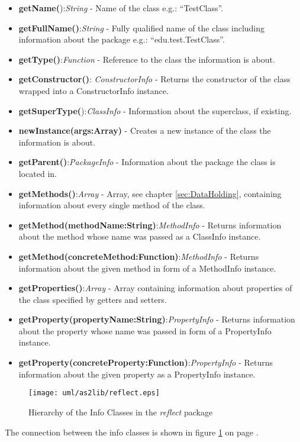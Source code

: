 \begin{itemize}
	\item \textbf{getName(}):\textit{String} - Name of the class e.g.: "`TestClass"'.
	\item \textbf{getFullName()}:\textit{String} - Fully qualified name of the class including information about the package e.g.: "`edu.test.TestClass"'.
	\item \textbf{getType()}:\textit{Function} - Reference to the class the information is about.
	\item \textbf{getConstructor()}: \textit{ConstructorInfo} - Returns the constructor of the class wrapped into a ConstructorInfo instance.
	\item \textbf{getSuperType(}):\textit{ClassInfo} - Information about the superclass, if existing.
	\item \textbf{newInstance(args:Array)} - Creates a new instance of the class the information is about.
	\item \textbf{getParent()}:\textit{PackageInfo} - Information about the package the class is located in.
	\item \textbf{getMethods()}:\textit{Array} - Array, see chapter \ref{sec:DataHolding}, containing information about every single method of the class.
	\item \textbf{getMethod(methodName:String)}:\textit{MethodInfo} - Returns information about the method whose name was passed as a ClassInfo instance.
	\item \textbf{getMethod(concreteMethod:Function)}:\textit{MethodInfo} - Returns information about the given method in form of a MethodInfo instance.
	\item \textbf{getProperties()}:\textit{Array} - Array containing information about properties of the class specified by getters and setters.
	\item \textbf{getProperty(propertyName:String)}:\textit{PropertyInfo} - Returns information about the property whose name was passed in form of a PropertyInfo instance. 
	\item \textbf{getProperty(concreteProperty:Function)}:\textit{PropertyInfo} - Returns information about the given property as a PropertyInfo instance.
\end{itemize}

\begin{figure}
\begin{center}
\texttt{[image: uml/as2lib/reflect.eps]}
\caption{Hierarchy of the Info Classes in the \emph{reflect} package}
\label{fig:as2libreflect}
\end{center}
\end{figure}
The connection between the info classes is shown in figure \ref{fig:as2libreflect} on page \pageref{fig:as2libreflect}.
